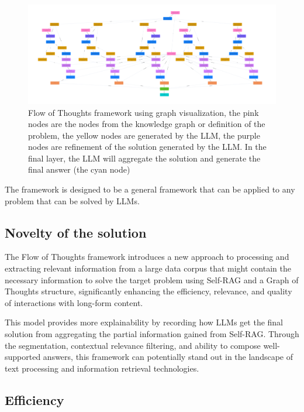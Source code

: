 \documentclass{article}
\begin{document}
    \begin{figure}[h]
        \centering
        \includegraphics[width=1.0\textwidth]{images/flow_of_thoughts.png}
        \caption{Flow of Thoughts framework using graph visualization, the pink nodes are the nodes from the knowledge graph or definition of the problem, the yellow nodes are generated by the LLM, the purple nodes are refinement of the solution generated by the LLM. In the final layer, the LLM will aggregate the solution and generate the final answer (the cyan node)}
        \label{fig:flow_of_thoughts}
    \end{figure}

    The framework is designed to be a general framework that can be applied to any problem that can be solved by LLMs.

\subsection{Novelty of the solution}

The Flow of Thoughts framework introduces a new approach to processing and extracting relevant information from a large data corpus that might contain the necessary information to solve the target problem using Self-RAG and a Graph of Thoughts structure, significantly enhancing the efficiency, relevance, and quality of interactions with long-form content. 

This model provides more explainability by recording how LLMs get the final solution from aggregating the partial information gained from Self-RAG. Through the segmentation, contextual relevance filtering, and ability to compose well-supported answers, this framework can potentially stand out in the landscape of text processing and information retrieval technologies.

\subsection{Efficiency}
\end{document}
